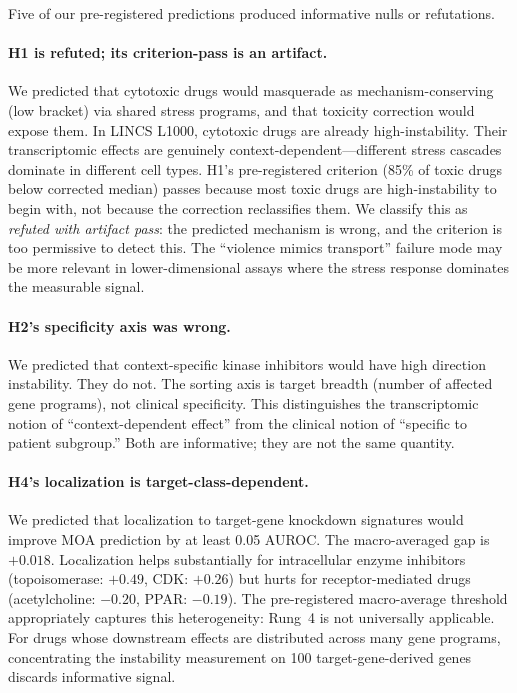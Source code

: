 \documentclass{article}
\begin{document}
Five of our pre-registered predictions produced informative nulls or refutations.

\paragraph{H1 is refuted; its criterion-pass is an artifact.}
We predicted that cytotoxic drugs would masquerade as mechanism-conserving
(low bracket) via shared stress programs, and that toxicity correction would
expose them. In LINCS L1000, cytotoxic drugs are already high-instability.
Their transcriptomic effects are genuinely context-dependent---different stress
cascades dominate in different cell types. H1's pre-registered criterion
(85\% of toxic drugs below corrected median) passes because most toxic drugs
are high-instability to begin with, not because the correction reclassifies
them. We classify this as \emph{refuted with artifact pass}: the predicted
mechanism is wrong, and the criterion is too permissive to detect this.
The ``violence mimics transport'' failure mode may be more relevant in
lower-dimensional assays where the stress response dominates the
measurable signal.

\paragraph{H2's specificity axis was wrong.}
We predicted that context-specific kinase inhibitors would have high direction
instability. They do not. The sorting axis is target breadth (number of
affected gene programs), not clinical specificity. This distinguishes the
transcriptomic notion of ``context-dependent effect'' from the clinical notion
of ``specific to patient subgroup.'' Both are informative; they are not the
same quantity.

\paragraph{H4's localization is target-class-dependent.}
We predicted that localization to target-gene knockdown signatures would
improve MOA prediction by at least 0.05 AUROC. The macro-averaged gap is
$+0.018$. Localization helps substantially for intracellular enzyme
inhibitors (topoisomerase: $+0.49$, CDK: $+0.26$) but hurts for
receptor-mediated drugs (acetylcholine: $-0.20$, PPAR: $-0.19$). The
pre-registered macro-average threshold appropriately captures this
heterogeneity: Rung~4 is not universally applicable. For drugs whose
downstream effects are distributed across many gene programs, concentrating
the instability measurement on 100 target-gene-derived genes discards
informative signal.
\end{document}
